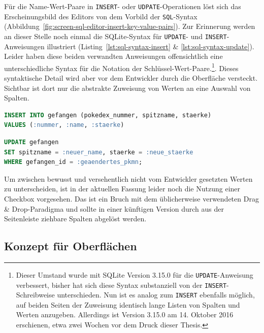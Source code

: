 Für die Name-Wert-Paare in \texttt{INSERT}- oder \texttt{UDPATE}-Operationen löst sich das Erscheinungsbild des Editors von dem Vorbild der \texttt{SQL}-Syntax (Abbildung~\ref{fig:screen-sql-editor-insert-key-value-pairs}). Zur Erinnerung werden an dieser Stelle noch einmal die SQLite-Syntax für \texttt{UPDATE}- und \texttt{INSERT}-Anweisungen illustriert (Listing~\ref{lst:sql-syntax-insert} \& \ref{lst:sql-syntax-update}). Leider haben diese beiden verwandten Anweisungen offensichtlich eine unterschiedliche Syntax für die Notation der Schlüssel-Wert-Paare.\footnote{Dieser Umstand wurde mit SQLite Version 3.15.0 für die \texttt{UPDATE}-Anweisung verbessert, bisher hat sich diese Syntax substanziell von der \texttt{INSERT}-Schreibweise unterschieden. Nun ist es analog zum \texttt{INSERT} ebenfalls möglich, auf beiden Seiten der Zuweisung identisch lange Listen von Spalten und Werten anzugeben. Allerdings ist Version 3.15.0 am 14. Oktober 2016 erschienen, etwa zwei Wochen vor dem Druck dieser Thesis.}. Dieses syntaktische Detail wird aber vor dem Entwickler durch die Oberfläche versteckt. Sichtbar ist dort nur die abstrakte Zuweisung von Werten an eine Auswahl von Spalten.

\begin{lstlisting}[language=SQL,float=h!,caption={Syntax einer \texttt{INSERT}-Anweisung}, label={lst:sql-syntax-insert}]
INSERT INTO gefangen (pokedex_nummer, spitzname, staerke)
VALUES (:nummer, :name, :staerke)
\end{lstlisting}

\begin{lstlisting}[language=SQL,float=h!,caption={Syntax einer \texttt{UPDATE}-Anweisung}, label={lst:sql-syntax-update}]
UPDATE gefangen
SET spitzname = :neuer_name, staerke = :neue_staerke
WHERE gefangen_id = :geaendertes_pkmn;
\end{lstlisting}

Um zwischen bewusst und versehentlich nicht vom Entwickler gesetzten Werten zu unterscheiden, ist in der aktuellen Fassung leider noch die Nutzung einer Checkbox vorgesehen. Das ist ein Bruch mit dem üblicherweise verwendeten Drag \& Drop-Paradigma und sollte in einer künftigen Version durch aus der Seitenleiste ziehbare Spalten abgelöst werden.

\subsection{Konzept für Oberflächen}
\label{sec:design-ui-concept}

